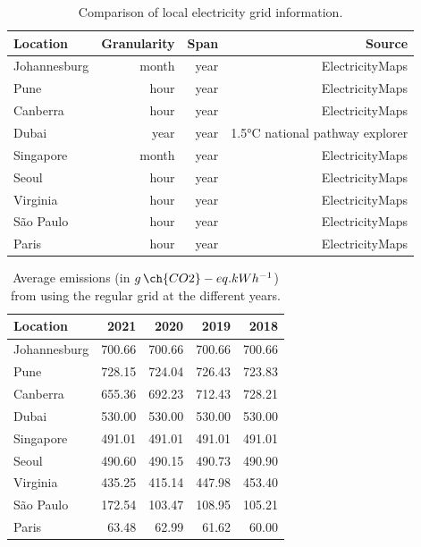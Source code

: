\begin{table}[h]  
\caption{Comparison of local electricity grid  information. }\label{tab:grid_emissions_hist} \centering  
  \begin{tabular}{|l|r|r|r|}
    \hline
    
  \textbf{Location} &   \textbf{Granularity} & \textbf{Span} & \textbf{Source} \\
  \hline
  Johannesburg & month & year & ElectricityMaps  \\
  \hline
  Pune  & hour & year & ElectricityMaps  \\
  \hline
  Canberra  & hour &  year & ElectricityMaps \\
  \hline
  Dubai    & year & year & 1.5°C national pathway explorer  \\                       
  \hline
  Singapore & month & year & ElectricityMaps \\
  \hline     
  Seoul     & hour & year & ElectricityMaps \\
  \hline
  Virginia  &  hour & year & ElectricityMaps \\
  \hline
  São Paulo & hour & year  & ElectricityMaps \\
  \hline 
  Paris     & hour & year  & ElectricityMaps  \\
  \hline
\end{tabular}  
\end{table}


\begin{table}[h]
  \caption{Average emissions (in $g\,\ch{CO2}-eq.kWh^{-1}$) from using the regular grid at the different years.}\label{tab:grid_emissions_avg_year} \centering
  \begin{tabular}{|l|r|r|r|r|}    
  \hline   
  \textbf{Location} &  \textbf{2021} & \textbf{2020} & \textbf{2019} & \textbf{2018}\\
  \hline
  Johannesburg & 700.66 & 700.66 & 700.66 & 700.66  \\
  \hline
  Pune & 728.15 & 724.04 & 726.43 & 723.83     \\
  \hline
  Canberra & 655.36 & 692.23 & 712.43 & 728.21\\
  \hline
  Dubai & 530.00  & 530.00 & 530.00 & 530.00     \\
  \hline
  Singapore & 491.01 & 491.01 & 491.01 & 491.01 \\
  \hline     
  Seoul & 490.60 & 490.15 & 490.73 & 490.90     \\
  \hline
  Virginia  & 435.25 & 415.14 & 447.98 & 453.40 \\
  \hline
  São Paulo &  172.54 &  103.47 & 108.95 &  105.21 \\
  \hline 
  Paris &  63.48  & 62.99 & 61.62   & 60.00   \\
  \hline

\end{tabular}  
\end{table}


